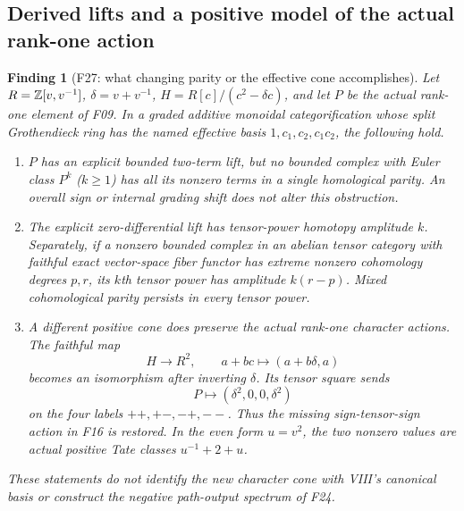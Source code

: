 \documentclass[11pt,a4paper]{article}
\newcommand{\fid}[1]{\textsf{#1}}\newcommand{\gate}[1]{\textsf{#1}}
\theoremstyle{named}\newtheorem{finding}{Finding}[section]
\theoremstyle{definition}\newtheorem{definition}[finding]{Definition}
\theoremstyle{remark}\newtheorem{remark}[finding]{Remark}
\begin{document}
\subsection{Derived lifts and a positive model of the actual rank-one action}
\begin{finding}[\fid{F27}: what changing parity or the effective cone accomplishes]\label{f:derived}
Let $R=\mathbb Z[v,v^{-1}]$, $\delta=v+v^{-1}$,
$H=R[c]/(c^2-\delta c)$, and let $P$ be the actual rank-one element
of \fid{F09}. In a graded additive monoidal categorification whose
split Grothendieck ring has the named effective basis
$1,c_1,c_2,c_1c_2$, the following hold.
\begin{enumerate}
\item $P$ has an explicit bounded two-term lift, but no bounded complex
with Euler class $P^k$ ($k\ge1$) has all its nonzero terms in a single
homological parity. An overall sign or internal grading shift does not
alter this obstruction.
\item The explicit zero-differential lift has tensor-power homotopy
amplitude $k$. Separately, if a nonzero bounded complex in an abelian tensor category
with faithful exact vector-space fiber functor has extreme nonzero
cohomology degrees $p,r$, its $k$th tensor power has amplitude $k(r-p)$.
Mixed cohomological parity persists in every tensor power.
\item A different positive cone does preserve the actual rank-one
character actions. The faithful map
\[
 H\longrightarrow R^2,\qquad a+bc\longmapsto(a+b\delta,a)
\]
becomes an isomorphism after inverting $\delta$. Its tensor square sends
\[
 P\longmapsto(\delta^2,0,0,\delta^2)
\]
on the four labels $++,+-,-+,--$. Thus the missing sign-tensor-sign
action in \fid{F16} is restored. In the even form $u=v^2$, the two
nonzero values are actual positive Tate classes
$u^{-1}+2+u$.
\end{enumerate}
These statements do not identify the new character cone with VIII's
canonical basis or construct the negative path-output spectrum of
\fid{F24}.
\end{finding}
\end{document}
